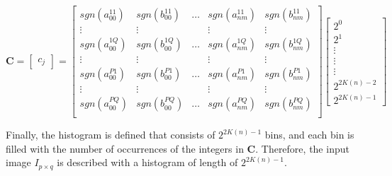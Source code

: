 \documentclass[]{spie}  %
\begin{document}
\begin{equation}
\mathbf{C} = 
\begin{bmatrix}
c_{j}
\end{bmatrix}=
  \begin{bmatrix}
sgn(a_{00}^{11}) & sgn(b_{00}^{11}) & \hdots & sgn(a_{nm}^{11}) & sgn(b_{nm}^{11}) \\
  \vdots  & \vdots & & \vdots  & \vdots\\
sgn(a_{00}^{1Q}) & sgn(b_{00}^{1Q}) & \hdots & sgn(a_{nm}^{1Q}) & sgn(b_{nm}^{1Q}) \\
  \vdots  & \vdots & & \vdots  & \vdots\\
sgn(a_{00}^{P1}) & sgn(b_{00}^{P1}) & \hdots & sgn(a_{nm}^{P1}) & sgn(b_{nm}^{P1}) \\
  \vdots  & \vdots & & \vdots  & \vdots\\
sgn(a_{00}^{PQ}) &sgn(b_{00}^{PQ}) & \hdots & sgn(a_{nm}^{PQ}) & sgn(b_{nm}^{PQ}) \\
 \end{bmatrix}
 \begin{bmatrix}
2^0 \\
2^1 \\
 \vdots \\
 \vdots \\
 \vdots \\
 2^{2 K(n)-2} \\
 2^{2 K(n)-1}
 \end{bmatrix}
 \label{eq:lzm_coded}
\end{equation}

Finally, the histogram is defined that consists of $2^{2K(n)-1}$ bins, and each bin is filled with the number of occurrences of the integers in $\mathbf{C}$. Therefore, the input image $I_{p\times q}$ is described with a histogram of length of $2^{2K(n)-1}$.
\end{document}
